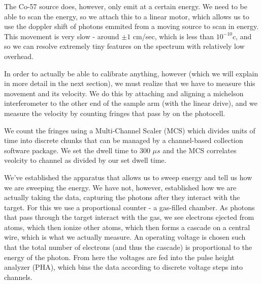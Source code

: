 \documentclass[reprint, nobibnotes, amssymb, amsmath, amsfonts, mathtools, mathrsfs, floatfix]{revtex4-1}
\begin{document}
      The Co-57 source does, however, only emit at a certain energy.  We need to be able to scan the energy, so we attach this to a linear motor, which allows us to use the doppler shift of photons emmited from a moving source to scan in energy.  This movement is very slow - around $\pm1$ cm/sec, which is less than $10^{-10} c$, and so we can resolve extremely tiny features on the spectrum with relatively low overhead.

      In order to actually be able to calibrate anything, however (which we will explain in more detail in the next section), we must realize that we have to measure this movement and its velocity.  We do this by attaching and aligning a michelson interferometer to the other end of the sample arm (with the linear drive), and we measure the velocity by counting fringes that pass by on the photocell.

      We count the fringes using a Multi-Channel Scaler (MCS) which divides units of time into discrete chunks that can be managed by a channel-based collection software package.  We set the dwell time to 300 $\mu s$ and the MCS correlates veolcity to channel as divided by our set dwell time.

      We've established the apparatus that allows us to sweep energy and tell us how we are sweeping the energy.  We have not, however, established how we are actually taking the data, capturing the photons after they interact with the target.  For this we use a proportional counter - a gas-filled chamber.  As photons that pass through the target interact with the gas, we see electrons ejected from atoms, which then ionize other atoms, which then forms a cascade on a central wire, which is what we actually measure.  An operating voltage is chosen such that the total number of electrons (and thus the cascade) is proportional to the energy of the photon.  From here the voltages are fed into the pulse height analyzer (PHA), which bins the data according to discrete voltage steps into channels.
\end{document}
